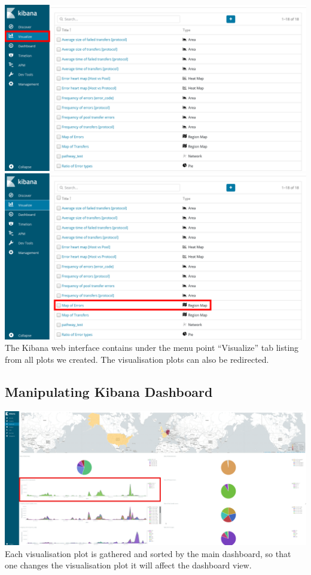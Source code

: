 \documentclass[]{article}
\begin{document}
\includegraphics{images/kibana_vis1.png}
\includegraphics{images/kibana_vis2.png} The Kibana web interface
contains under the menu point ``Visualize'' tab listing from all plots
we created. The visualisation plots can also be redirected.

\subsection{Manipulating Kibana
Dashboard}\label{manipulating-kibana-dashboard}

\includegraphics{images/kibana_main1.png} Each visualisation plot is
gathered and sorted by the main dashboard, so that one changes the
visualisation plot it will affect the dashboard view.
\end{document}
